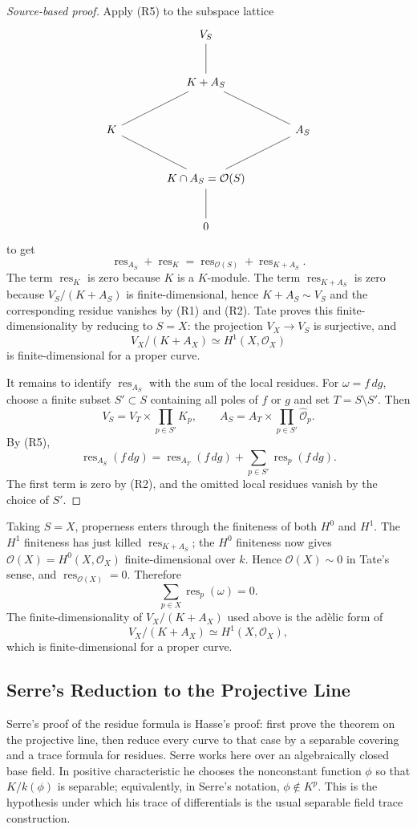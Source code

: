 \documentclass[11pt,a4paper]{article}
\newcommand{\OO}{\mathcal O}
\newcommand{\wideO}{\widehat{\mathcal O}}
\newcommand{\res}{\operatorname{res}}
\theoremstyle{definition}
\theoremstyle{plain}
\theoremstyle{remark}
\begin{document}
\begin{proof}[Source-based proof]
Apply (R5) to the subspace lattice
\[
\begin{tikzcd}[row sep=large,column sep=large]
& V_S \arrow[d, dash, no head] & \\
& K+A_S \arrow[dl, dash, no head] \arrow[dr, dash, no head] & \\
K \arrow[dr, dash, no head] && A_S \arrow[dl, dash, no head] \\
& K\cap A_S=\OO(S) \arrow[d, dash, no head] & \\
& 0 &
\end{tikzcd}
\]
to get
\[
  \res_{A_S}+\res_K=\res_{\OO(S)}+\res_{K+A_S}.
\]
The term $\res_K$ is zero because $K$ is a $K$-module.  The term $\res_{K+A_S}$ is zero because $V_S/(K+A_S)$ is finite-dimensional, hence $K+A_S\sim V_S$ and the corresponding residue vanishes by (R1) and (R2).  Tate proves this finite-dimensionality by reducing to $S=X$: the projection $V_X\to V_S$ is surjective, and
\[
  V_X/(K+A_X)\simeq H^1(X,\OO_X)
\]
is finite-dimensional for a proper curve.

It remains to identify $\res_{A_S}$ with the sum of the local residues.  For $\omega=f\,dg$, choose a finite subset $S'\subset S$ containing all poles of $f$ or $g$ and set $T=S\setminus S'$.  Then
\[
  V_S=V_T\times\prod_{p\in S'}K_p,
  \qquad
  A_S=A_T\times\prod_{p\in S'}\wideO_p.
\]
By (R5),
\[
  \res_{A_S}(f\,dg)=\res_{A_T}(f\,dg)+\sum_{p\in S'}\res_p(f\,dg).
\]
The first term is zero by (R2), and the omitted local residues vanish by the choice of $S'$.
\end{proof}

Taking $S=X$, properness enters through the finiteness of both $H^0$ and $H^1$.  The $H^1$ finiteness has just killed $\res_{K+A_S}$; the $H^0$ finiteness now gives $\OO(X)=H^0(X,\OO_X)$ finite-dimensional over $k$.  Hence $\OO(X)\sim 0$ in Tate's sense, and $\res_{\OO(X)}=0$.  Therefore
\[
  \sum_{p\in X}\res_p(\omega)=0.
\]
The finite-dimensionality of $V_X/(K+A_X)$ used above is the adèlic form of
\[
  V_X/(K+A_X)\simeq H^1(X,\OO_X),
\]
which is finite-dimensional for a proper curve.

\subsection{Serre's Reduction to the Projective Line}

Serre's proof of the residue formula is Hasse's proof: first prove the theorem on the projective line, then reduce every curve to that case by a separable covering and a trace formula for residues.  Serre works here over an algebraically closed base field.  In positive characteristic he chooses the nonconstant function $\phi$ so that $K/k(\phi)$ is separable; equivalently, in Serre's notation, $\phi\notin K^p$.  This is the hypothesis under which his trace of differentials is the usual separable field trace construction.
\end{document}
